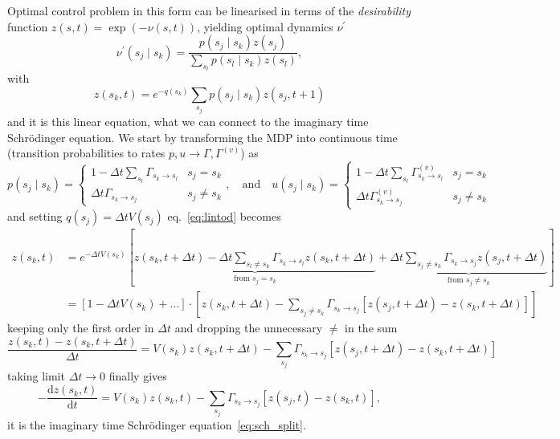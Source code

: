 Optimal control problem in this form can be linearised in terms of the \emph{desirability} function $z(s, t)=\exp (-\nu(s, t))$, yielding optimal dynamics $\nu^\prime$
\begin{equation}
	\nu^{\prime}(s_j \mid s_k)=\frac{p(s_j \mid s_k) z(s_j)}{\sum_{s_l} p(s_l \mid s_k) z(s_l)},
\end{equation}
with
\begin{equation}
	\label{eq:lintod}
	z(s_k, t)=e^{-q(s_k)} \sum_{s_j} p(s_j \mid s_k) z(s_j, t+1)
\end{equation}
and it is this linear equation, what we can connect to the imaginary time Schr\" odinger equation. We start by transforming the MDP into continuous time (transition probabilities to rates $p, u \rightarrow \Gamma, \Gamma^{(v)}$) as
\begin{equation}
	p(s_j \mid s_k)=\left\{\begin{array}{ll}
	1-\Delta t \sum_{s_l} \Gamma_{s_k \rightarrow s_l} & s_j=s_k \\
	\Delta t \Gamma_{s_k \rightarrow s_j} & s_j \neq s_k
	\end{array}\right.
	, \quad \text{and} \quad 
	u(s_j \mid s_k)=\left\{\begin{array}{ll}
	1-\Delta t \sum_{s_l} \Gamma_{s_k \rightarrow s_l}^{(v)} & s_j=s_k \\
	\Delta t \Gamma_{s_k \rightarrow s_j}^{(v)} & s_j \neq s_k
	\end{array}\right.
\end{equation}
and setting $q(s_j) = \Delta t V(s_j)$ eq.~\eqref{eq:lintod} becomes
\begin{equation}
	\begin{aligned}
	z(s_k, t) &= e^{-\Delta t V(s_k)} \left[
				\underbrace{z(s_k, t + \Delta t) - \Delta t \sum_{s_l \neq s_k}\Gamma_{s_{k} \rightarrow s_{l}} z(s_k, t + \Delta t)}_{\text{from } s_j = s_k}
				+
				 \underbrace{\Delta t \sum_{s_j \neq s_k} \Gamma_{s_k \rightarrow s_j} z(s_j, t + \Delta t)}_{\text{from } s_j \neq s_k}
				\right] \\
			  &= \left[1 - \Delta t V(s_k) + \ldots\right]\cdot
			     \left[z(s_k, t + \Delta t) 
			     - \sum_{s_j \neq s_k} \Gamma_{s_k \rightarrow s_j} 
			     	\left[
			     	z(s_j, t + \Delta t) - z(s_k, t + \Delta t)\right]
		     	\right]
	\end{aligned}
\end{equation}
keeping only the first order in $\Delta t$ and dropping the unnecessary $\neq$ in the sum
\begin{equation}
	\frac{z(s_k, t) - z(s_k, t + \Delta t)}{\Delta t} = V(s_k) z(s_k, t + \Delta t) - \sum_{s_j} \Gamma_{s_k \rightarrow s_j} 
	\left[
	z(s_j, t + \Delta t) - z(s_k, t + \Delta t)\right]
\end{equation}
taking limit $\Delta t \rightarrow 0$ finally gives
\begin{equation}
	-\frac{\mathrm{d} z(s_k, t)}{\mathrm{d} t} =  V(s_k) z(s_k, t) - \sum_{s_j} \Gamma_{s_k \rightarrow s_j} 
	\left[
	z(s_j, t) - z(s_k, t)\right],
\end{equation}
it is the imaginary time Schr\" odinger equation~\eqref{eq:sch_split}.

